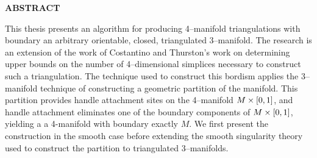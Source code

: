 \newpage
\newpage{}


\begin{center}
\textbf{ABSTRACT}
\end{center}

This thesis presents an algorithm for producing 4--manifold triangulations with boundary an arbitrary orientable, closed, triangulated 3--manifold.
The research is an extension of the work of Costantino and Thurston's work on determining upper bounds on the number of 4--dimensional simplices necessary to construct such a triangulation.
The technique used to construct this bordism applies the 3--manifold technique of constructing a geometric partition of the manifold.
This partition provides handle attachment sites on the 4--manifold $M \times [0,1]$, and handle attachment eliminates one of the boundary components of $M\times [0,1]$, yielding a a 4-manifold with boundary exactly $M$.
We first present the construction in the smooth case before extending the smooth singularity theory used to construct the partition to triangulated 3--manifolds.

\pagebreak